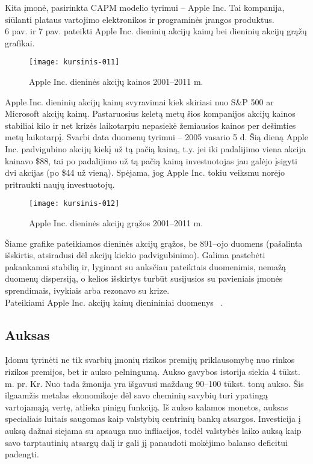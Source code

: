 \documentclass[12pt, a14paper, lithuanian]{article}
\begin{document}
Kita įmonė, pasirinkta CAPM modelio tyrimui -- Apple Inc. Tai kompanija, siūlanti plataus vartojimo elektronikos
ir programinės įrangos produktus. \\
6 pav. ir 7 pav. pateikti Apple Inc. dieninių akcijų
kainų bei dieninių akcijų grąžų grafikai.

\begin{figure}[H]
  \centering
\texttt{[image: kursinis-011]}
  \caption{Apple Inc. dieninės akcijų kainos 2001--2011 m.}
  \label{fig:6}
\end{figure}

Apple Inc. dieninių akcijų kainų svyravimai kiek skiriasi nuo S\&P 500 ar Microsoft akcijų kainų. Pastaruosius
keletą metų šios kompanijos akcijų kainos stabiliai kilo ir net krizės laikotarpiu nepasiekė žemiausios
kainos per dešimties metų laikotarpį. Svarbi data duomenų tyrimui -- 2005 vasario 5 d. Šią dieną Apple Inc.
padvigubino akcijų kiekį už tą pačią kainą, t.y. jei iki padalijimo viena akcija kainavo \$88, tai po padalijimo
už tą pačią kainą investuotojas jau galėjo įsigyti dvi akcijas (po \$44 už vieną). Spėjama, jog Apple Inc.
tokiu veiksmu norėjo pritraukti naujų investuotojų.

\begin{figure}[H]
  \centering
\texttt{[image: kursinis-012]}
  \caption{Apple Inc. dieninės akcijų grąžos 2001--2011 m.}
  \label{fig:7}
\end{figure}
             
Šiame grafike pateikiamos dieninės akcijų grąžos, be 891--ojo duomens (pašalinta išskirtis, atsiradusi dėl akcijų kiekio padvigubinimo). Galima pastebėti pakankamai stabilią ir, lyginant su anksčiau pateiktais duomenimis, nemažą duomenų dispersiją, o kelios išskirtys turbūt susijusios su pavieniais įmonės sprendimais, ivykiais arba rezonavo su krize. \\

Pateikiami Apple Inc. akcijų kainų dienininiai duomenys~\cite{apple} .
\subsection{Auksas}

Įdomu tyrinėti ne tik svarbių įmonių rizikos premijų priklausomybę nuo rinkos rizikos premijos, bet ir
aukso pelningumą. Aukso gavybos istorija siekia 4 tūkst. m. pr. Kr. Nuo tada žmonija yra išgavusi maždaug 90--100 tūkst. tonų aukso. Šis ilgaamžis metalas ekonomikoje dėl savo cheminių savybių turi ypatingą vartojamąją vertę, atlieka pinigų funkciją. Iš aukso kalamos monetos, auksas specialiais luitais saugomas kaip valstybių centrinių bankų atsargos. Investicija į auksą dažnai siejama su apsauga nuo infliacijos, todėl valstybės laiko auksą kaip savo tarptautinių atsargų dalį ir gali jį panaudoti mokėjimo balanso deficitui padengti.\\
\end{document}
